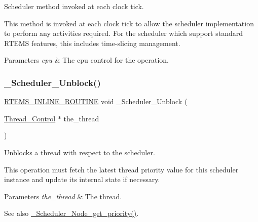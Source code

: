 Scheduler method invoked at each clock tick. 

This method is invoked at each clock tick to allow the scheduler implementation to perform any activities required. For the scheduler which support standard R\+T\+E\+MS features, this includes time-\/slicing management.


\begin{DoxyParams}{Parameters}
{\em cpu} & The cpu control for the operation. \\
\hline
\end{DoxyParams}
\mbox{\label{group__RTEMSScoreScheduler_ga8289b090b6cb3c711ba614a047d4a343}} 
\subsubsection{\texorpdfstring{\_Scheduler\_Unblock()}{\_Scheduler\_Unblock()}}
{\footnotesize\ttfamily \mbox{\hyperlink{group__RTEMSScoreBaseDefs_gac216239df231d5dbd15e3520b0b9313f}{R\+T\+E\+M\+S\+\_\+\+I\+N\+L\+I\+N\+E\+\_\+\+R\+O\+U\+T\+I\+NE}} void \+\_\+\+Scheduler\+\_\+\+Unblock (\begin{DoxyParamCaption}\item[{\mbox{\hyperlink{struct__Thread__Control}{Thread\+\_\+\+Control}} $\ast$}]{the\+\_\+thread }\end{DoxyParamCaption})}



Unblocks a thread with respect to the scheduler. 

This operation must fetch the latest thread priority value for this scheduler instance and update its internal state if necessary.


\begin{DoxyParams}{Parameters}
{\em the\+\_\+thread} & The thread.\\
\hline
\end{DoxyParams}
\begin{DoxySeeAlso}{See also}
\mbox{\hyperlink{group__RTEMSScoreScheduler_gaefec9c3ea8b8a7a2090d982af594f414}{\+\_\+\+Scheduler\+\_\+\+Node\+\_\+get\+\_\+priority()}}. 
\end{DoxySeeAlso}
\mbox{\label{group__RTEMSScoreScheduler_gaa2f56f77ed86e3d02527742f917fcd0c}} 
